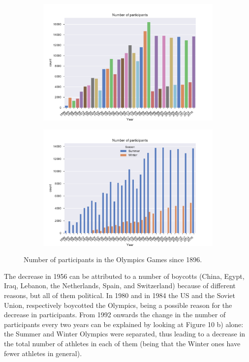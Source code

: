 \documentclass[11pt]{article} %
\begin{document}
\begin{figure}
    \centering
    \begin{subfigure}{1\textwidth}
    \centering
    \includegraphics[scale=0.65]{Participants_year.pdf}
    \end{subfigure}
    \begin{subfigure}{1\textwidth}
    \centering
    \includegraphics[scale=0.65]{Participants_year_season.pdf}
    \end{subfigure}
    \caption{Number of participants in the Olympics Games since 1896.}
\end{figure}

The decrease in 1956 can be attributed to a number of boycotts (China, Egypt, Iraq, Lebanon, the Netherlands, Spain, and Switzerland) because of different reasons, but all of them political. In 1980 and in 1984 the US and the Soviet Union, respectively boycotted the Olympics, being a possible reason for the decrease in participants. From 1992 onwards the change in the number of participants every two years can be explained by looking at Figure 10 b) alone: the Summer and Winter Olympics were separated, thus leading to a decrease in the total number of athletes in each of them (being that the Winter ones have fewer athletes in general). 
\end{document}
